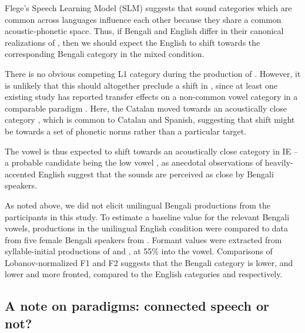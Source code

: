 \documentclass[charis,linguex]{glossa}
\newcommand{\nt}[1]{\textipa{[#1]}} %
\begin{document}

Flege's Speech Learning Model (SLM) \citep{flege1995second,flege2007language} suggests that sound categories which are common across languages influence each other because they share a common acoustic-phonetic space. Thus, if Bengali and English differ in their canonical realizations of \nt{\ae}, then we should expect the English \nt{\ae} to shift towards the corresponding Bengali category in the mixed condition. 


There is no obvious competing L1 category during the production of \nt{2}. However, it is unlikely that this should altogether preclude a shift in \nt{2}, since at least one existing study has reported transfer effects on a non-common vowel category in a comparable paradigm \citep{simonet2014phonetic}. Here, the Catalan \nt{O} moved towards an acoustically close category \nt{o}, which is common to Catalan and Spanish, suggesting that shift might be towards a set of phonetic norms rather than a particular target. 

The vowel \nt{2} is thus expected to shift towards an acoustically close category in IE -- a probable candidate being the low vowel \nt{a:}, as anecdotal observations of heavily-accented English suggest that the sounds are perceived as close by Bengali speakers. 

As noted above, we did not elicit unilingual Bengali productions from the participants in this study. To estimate a baseline value for the relevant Bengali vowels, productions in the unilingual English condition were compared to data from five female Bengali speakers from \cite{dutta2016using}. Formant values were extracted from syllable-initial productions of \nt{\ae} and \nt{a:}, at 55\% into the vowel. Comparisons of Lobanov-normalized F1 and F2 suggests that the Bengali category \nt{\ae} is lower, and \nt{a:} lower and more fronted, compared to the English categories \nt{\ae} and \nt{2} respectively. 

\subsection{A note on paradigms: connected speech or not?} \label{paradigms}
\end{document}
